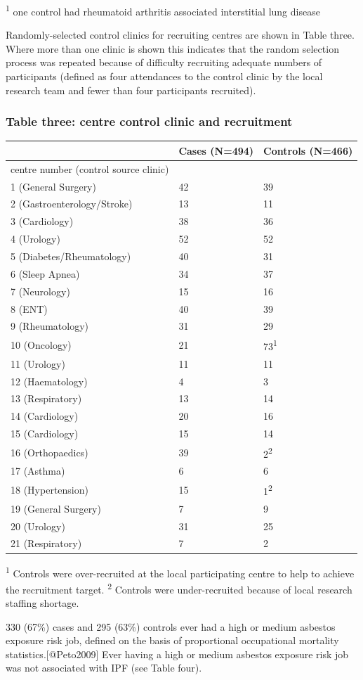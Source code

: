 \documentclass[
]{article}
\begin{document}
\textsuperscript{1} one control had rheumatoid arthritis associated
interstitial lung disease

Randomly-selected control clinics for recruiting centres are shown in
Table three. Where more than one clinic is shown this indicates that the
random selection process was repeated because of difficulty recruiting
adequate numbers of participants (defined as four attendances to the
control clinic by the local research team and fewer than four
participants recruited).

\newpage

\hypertarget{table-three-centre-control-clinic-and-recruitment}{%
\subsubsection{Table three: centre control clinic and
recruitment}\label{table-three-centre-control-clinic-and-recruitment}}

\begin{longtable}[]{@{}lll@{}}
\toprule
& Cases (N=494) & Controls (N=466)\tabularnewline
\midrule
\endhead
centre number (control source clinic) & &\tabularnewline
1 (General Surgery) & 42 & 39\tabularnewline
2 (Gastroenterology/Stroke) & 13 & 11\tabularnewline
3 (Cardiology) & 38 & 36\tabularnewline
4 (Urology) & 52 & 52\tabularnewline
5 (Diabetes/Rheumatology) & 40 & 31\tabularnewline
6 (Sleep Apnea) & 34 & 37\tabularnewline
7 (Neurology) & 15 & 16\tabularnewline
8 (ENT) & 40 & 39\tabularnewline
9 (Rheumatology) & 31 & 29\tabularnewline
10 (Oncology) & 21 & 73\textsuperscript{1}\tabularnewline
11 (Urology) & 11 & 11\tabularnewline
12 (Haematology) & 4 & 3\tabularnewline
13 (Respiratory) & 13 & 14\tabularnewline
14 (Cardiology) & 20 & 16\tabularnewline
15 (Cardiology) & 15 & 14\tabularnewline
16 (Orthopaedics) & 39 & 2\textsuperscript{2}\tabularnewline
17 (Asthma) & 6 & 6\tabularnewline
18 (Hypertension) & 15 & 1\textsuperscript{2}\tabularnewline
19 (General Surgery) & 7 & 9\tabularnewline
20 (Urology) & 31 & 25\tabularnewline
21 (Respiratory) & 7 & 2\tabularnewline
\bottomrule
\end{longtable}

\textsuperscript{1} Controls were over-recruited at the local
participating centre to help to achieve the recruitment target.
\textsuperscript{2} Controls were under-recruited because of local
research staffing shortage.

330 (67\%) cases and 295 (63\%) controls ever had a high or medium
asbestos exposure risk job, defined on the basis of proportional
occupational mortality statistics.{[}@Peto2009{]} Ever having a high or
medium asbestos exposure risk job was not associated with IPF (see Table
four).
\end{document}

